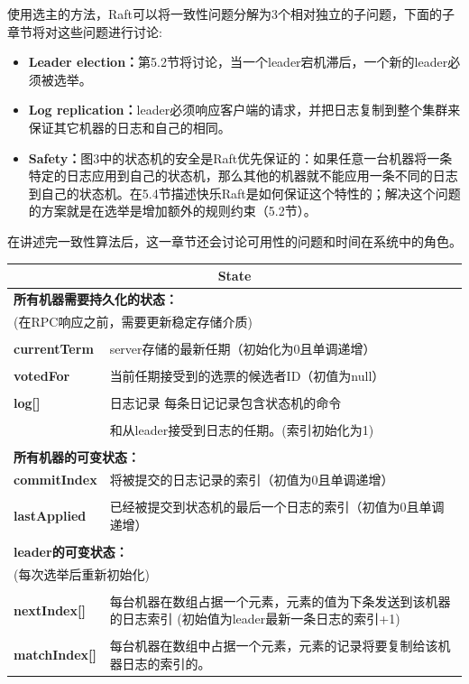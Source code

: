 \documentclass[journal]{IEEEtran}
\begin{document}
使用选主的方法，Raft可以将一致性问题分解为3个相对独立的子问题，下面的子章节将对这些问题进行讨论:

\begin{itemize}
\item \textbf{Leader election：}第5.2节将讨论，当一个leader宕机滞后，一个新的leader必须被选举。
\item \textbf{Log replication：}leader必须响应客户端的请求，并把日志复制到整个集群来保证其它机器的日志和自己的相同。
\item \textbf{Safety：}图3中的状态机的安全是Raft优先保证的：如果任意一台机器将一条特定的日志应用到自己的状态机，那么其他的机器就不能应用一条不同的日志到自己的状态机。在5.4节描述快乐Raft是如何保证这个特性的；解决这个问题的方案就是在选举是增加额外的规则约束（5.2节）。
\end{itemize}


在讲述完一致性算法后，这一章节还会讨论可用性的问题和时间在系统中的角色。

\begin{table}[htp]
\begin{center}
\begin{tabular}{|p{2cm}p{6cm}|}
\hline
\multicolumn{2}{|c|}{\textbf{State}}  \\
\hline
\multicolumn{2}{|l|}{\textbf{所有机器需要持久化的状态：}} \\
\multicolumn{2}{|l|}{(在RPC响应之前，需要更新稳定存储介质)} \\
&\\
\textbf{currentTerm} & server存储的最新任期（初始化为0且单调递增）\\
&\\
\textbf{votedFor} & 当前任期接受到的选票的候选者ID（初值为null）\\
&\\
\textbf{log[]} & 日志记录 每条日记记录包含状态机的命令 \\ 
&\\
 & 和从leader接受到日志的任期。(索引初始化为1) \\
&\\
\multicolumn{2}{|l|}{\textbf{所有机器的可变状态：}} \\
\textbf{commitIndex} & 将被提交的日志记录的索引（初值为0且单调递增）\\
&\\
\textbf{lastApplied} & 已经被提交到状态机的最后一个日志的索引（初值为0且单调递增）\\
&\\
\multicolumn{2}{|l|}{\textbf{leader的可变状态：}} \\
\multicolumn{2}{|l|}{(每次选举后重新初始化)} \\
&\\
\textbf{nextIndex[]} & 每台机器在数组占据一个元素，元素的值为下条发送到该机器的日志索引 (初始值为leader最新一条日志的索引+1)\\
&\\
\textbf{matchIndex[]} & 每台机器在数组中占据一个元素，元素的记录将要复制给该机器日志的索引的。\\
\hline
\end{tabular}
\end{center}
\label{default}
\end{table}%
\end{document}
